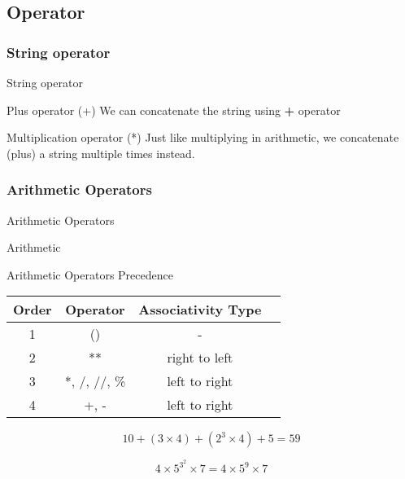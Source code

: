 \documentclass{beamer}
\begin{document}
\subsection[Operator]{Operator}
\subsubsection{String operator}
\begin{frame}{String operator}
    \begin{block}{Plus operator (+)}
        We can concatenate the string using \textbf{+} operator
        
    \end{block}
    \begin{block}{Multiplication operator (*)}
        Just like multiplying in arithmetic, we concatenate (plus) a string multiple times instead.
        
    \end{block}
\end{frame}

\subsubsection{Arithmetic Operators}
\begin{frame}{Arithmetic Operators}
    \begin{block}{Arithmetic}
        
    \end{block}
\end{frame}

\begin{frame}{Arithmetic Operators Precedence}
    \centering
    \begin{tabular}{|c|c|c|c|}
        \hline
        Order & Operator     & Associativity Type \\
        \hline
        1     & ()           & -                  \\
        \hline
        2     & **           & right to left      \\
        \hline
        3     & *, /, //, \% & left to right      \\
        \hline
        4     & +, -         & left to right      \\
        \hline
    \end{tabular}
\end{frame}

\begin{frame}
    \begin{example}
        
        $$
            10 + (3\times4) + (2^3 \times 4) + 5 = 59
        $$
    \end{example}
    \begin{example}
        
        $$
            4 \times 5^{3^2} \times 7 = 4 \times 5^9 \times 7
        $$
    \end{example}
\end{frame}
\end{document}
